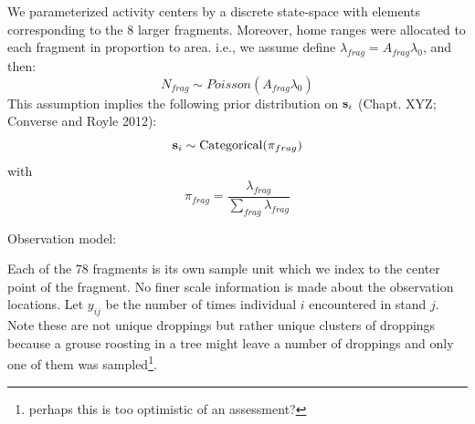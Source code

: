 We parameterized activity centers by a discrete state-space with elements
corresponding to the 8 larger fragments. Moreover, home ranges were allocated
to each fragment in  proportion to area. i.e., we assume
define $\lambda_{frag} = A_{frag} \lambda_{0}$, and then:
\[
 N_{frag} \sim Poisson( A_{frag} \lambda_{0} )
\]
This assumption implies the following prior distribution on ${\bf s}_{i}$ (Chapt.
XYZ; Converse and Royle 2012):
\[
{\bf s}_{i} \sim  \mbox{Categorical}(  \pi_{frag} )
\]
with
\[
 \pi_{frag} = \frac{ \lambda_{frag} }{\sum_{frag} \lambda_{frag}}
\]


Observation model:

Each of the 78 fragments is its own sample unit which we index to the
center point of the fragment. No finer scale information is made about
the observation locations.
Let $y_{ij}$ be  the number of times individual $i$ encountered in stand $j$.
Note these are not unique droppings but rather unique clusters of
droppings because a grouse roosting in a tree might leave a number of
droppings and only one of them was sampled\footnote{perhaps this is
  too optimistic of an assessment?}.






